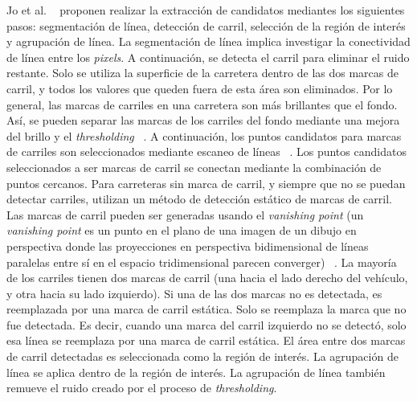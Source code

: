 Jo et al. ~ proponen realizar la extracción de candidatos mediantes los siguientes pasos: segmentación
de línea, detección de carril, selección de la región de interés y agrupación de línea. La segmentación de línea implica investigar la conectividad 
de línea entre los \emph{pixels}. A continuación, se detecta el carril para eliminar el ruido restante. Solo se utiliza la superficie de la carretera dentro de las dos marcas de 
carril, y todos los valores que queden fuera de esta área son eliminados. Por lo general, las marcas de carriles en una carretera son más brillantes que el fondo.
Así, se pueden separar las marcas de los carriles del fondo mediante una  mejora del brillo y el \emph{thresholding} ~. A continuación, los 
puntos candidatos para marcas de carriles son seleccionados mediante escaneo de líneas ~. Los puntos candidatos seleccionados a ser marcas de carril 
se conectan mediante la combinación de puntos cercanos. Para carreteras sin marca de carril, y siempre que no se puedan detectar carriles, utilizan 
un método de detección estático de marcas de carril. Las marcas de carril pueden ser generadas usando el \emph{vanishing point} (un \emph{vanishing point} es un punto 
en el plano de una imagen de un dibujo en perspectiva donde las proyecciones en perspectiva bidimensional de líneas paralelas entre sí en el espacio 
tridimensional parecen converger) ~. La mayoría de los carriles tienen dos marcas de carril (una hacia el lado derecho 
del vehículo, y otra hacia su lado izquierdo). Si una de las dos marcas no es detectada, es reemplazada por una marca de carril estática. Solo 
se reemplaza la marca que no fue detectada. Es decir, cuando una marca del carril izquierdo no se detectó, solo esa línea se reemplaza por una marca 
de carril estática. El área entre dos marcas de carril detectadas es seleccionada como la región de interés. La agrupación 
de línea se aplica dentro de la región de interés. La agrupación de línea también remueve el ruido creado por el proceso de \emph{thresholding}.

